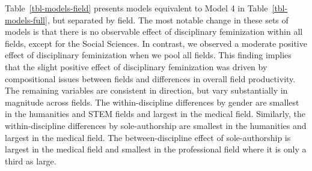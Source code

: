 \documentclass[
  10pt,
  letterpaper,
]{article}
\begin{document}
Table~\ref{tbl-models-field} presents models equivalent to Model 4 in
Table~\ref{tbl-models-full}, but separated by field. The most notable
change in these sets of models is that there is no observable effect of
disciplinary feminization within all fields, except for the Social
Sciences. In contrast, we observed a moderate positive effect of
disciplinary feminization when we pool all fields. This finding implies
that the slight positive effect of disciplinary feminization was driven
by compositional issues between fields and differences in overall field
productivity. The remaining variables are consistent in direction, but
vary substantially in magnitude across fields. The within-discipline
differences by gender are smallest in the humanities and STEM fields and
largest in the medical field. Similarly, the within-discipline
differences by sole-authorship are smallest in the humanities and
largest in the medical field. The between-discipline effect of
sole-authorship is largest in the medical field and smallest in the
professional field where it is only a third as large.
\end{document}

